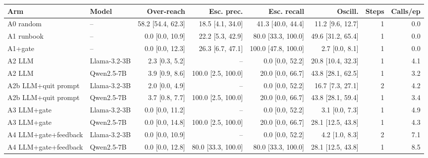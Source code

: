 \begin{tabular}{llrrrrrr}
\toprule
Arm & Model & Over-reach & Esc. prec. & Esc. recall & Oscill. & Steps & Calls/ep \\
\midrule
A0 random & -- & 58.2 [54.4, 62.3] & 18.5 [4.1, 34.0] & 41.3 [40.0, 44.4] & 11.2 [9.6, 12.7] & 1 & 0.0 \\
A1 runbook & -- & 0.0 [0.0, 10.9] & 22.2 [5.3, 42.9] & 80.0 [33.3, 100.0] & 49.6 [31.2, 65.4] & 1 & 0.0 \\
A1+gate & -- & 0.0 [0.0, 12.3] & 26.3 [6.7, 47.1] & 100.0 [47.8, 100.0] & 2.7 [0.0, 8.1] & 1 & 0.0 \\
A2 LLM & Llama-3.2-3B & 2.3 [0.3, 5.2] & -- & 0.0 [0.0, 52.2] & 20.8 [10.4, 32.3] & 1 & 4.1 \\
A2 LLM & Qwen2.5-7B & 3.9 [0.9, 8.6] & 100.0 [2.5, 100.0] & 20.0 [0.0, 66.7] & 43.8 [28.1, 62.5] & 1 & 3.2 \\
A2b LLM+quit prompt & Llama-3.2-3B & 2.0 [0.0, 4.9] & -- & 0.0 [0.0, 52.2] & 16.7 [7.3, 27.1] & 2 & 4.2 \\
A2b LLM+quit prompt & Qwen2.5-7B & 3.7 [0.8, 7.7] & 100.0 [2.5, 100.0] & 20.0 [0.0, 66.7] & 43.8 [28.1, 59.4] & 1 & 3.4 \\
A3 LLM+gate & Llama-3.2-3B & 0.0 [0.0, 11.2] & -- & 0.0 [0.0, 52.2] & 3.1 [0.0, 7.3] & 1 & 4.9 \\
A3 LLM+gate & Qwen2.5-7B & 0.0 [0.0, 14.8] & 100.0 [2.5, 100.0] & 20.0 [0.0, 66.7] & 28.1 [12.5, 43.8] & 1 & 4.3 \\
A4 LLM+gate+feedback & Llama-3.2-3B & 0.0 [0.0, 10.9] & -- & 0.0 [0.0, 52.2] & 4.2 [1.0, 8.3] & 2 & 7.1 \\
A4 LLM+gate+feedback & Qwen2.5-7B & 0.0 [0.0, 12.8] & 80.0 [33.3, 100.0] & 80.0 [33.3, 100.0] & 28.1 [12.5, 43.8] & 1 & 8.5 \\
\bottomrule
\end{tabular}
